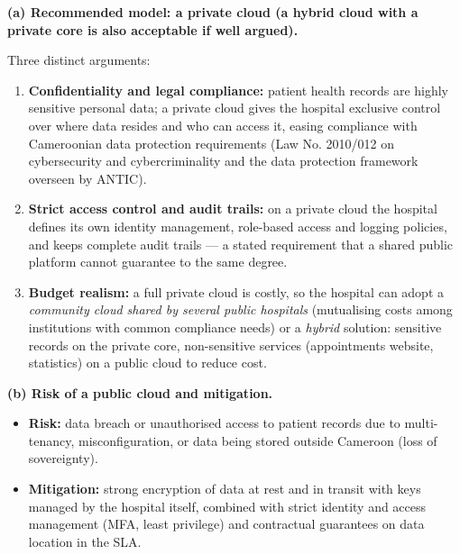 \documentclass[11pt]{article}
\newcommand{\cle}[1]{{\popxbold\color{popdark}#1}}
\begin{document}
\begin{corrige}
\textbf{(a) Recommended model: a \cle{private cloud} (a hybrid cloud with a private core is also acceptable if well argued).}

Three distinct arguments:
\begin{enumerate}
\item \textbf{Confidentiality and legal compliance:} patient health records are highly sensitive personal data; a private cloud gives the hospital exclusive control over where data resides and who can access it, easing compliance with Cameroonian data protection requirements (Law No. 2010/012 on cybersecurity and cybercriminality and the data protection framework overseen by ANTIC).
\item \textbf{Strict access control and audit trails:} on a private cloud the hospital defines its own identity management, role-based access and logging policies, and keeps complete audit trails — a stated requirement that a shared public platform cannot guarantee to the same degree.
\item \textbf{Budget realism:} a full private cloud is costly, so the hospital can adopt a \emph{community cloud shared by several public hospitals} (mutualising costs among institutions with common compliance needs) or a \emph{hybrid} solution: sensitive records on the private core, non-sensitive services (appointments website, statistics) on a public cloud to reduce cost.
\end{enumerate}

\textbf{(b) Risk of a public cloud and mitigation.}
\begin{itemize}
\item \textbf{Risk:} data breach or unauthorised access to patient records due to multi-tenancy, misconfiguration, or data being stored outside Cameroon (loss of sovereignty).
\item \textbf{Mitigation:} strong encryption of data at rest and in transit with keys managed by the hospital itself, combined with strict identity and access management (MFA, least privilege) and contractual guarantees on data location in the SLA.
\end{itemize}
\end{corrige}
\end{document}
